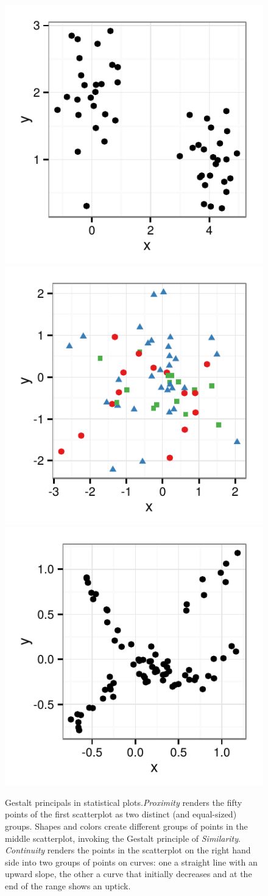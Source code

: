 \documentclass[11pt]{isuthesis}\usepackage[]{graphicx}\usepackage[]{color}
\newenvironment{knitrout}{}{} %
\begin{document}
\begin{figure}\centering
\begin{knitrout}
\color{fgcolor}

{\centering \includegraphics[width=0.32\linewidth]{Figure/FeatureHierarchy/fig-gestalt1-1} 
\includegraphics[width=0.32\linewidth]{Figure/FeatureHierarchy/fig-gestalt1-2} 
\includegraphics[width=0.32\linewidth]{Figure/FeatureHierarchy/fig-gestalt1-3} 

}



\end{knitrout}
\caption[Gestalt principles in statistical plots]{\label{fig:gestalt} Gestalt principals in statistical plots.\emph{Proximity} renders the fifty points of the first scatterplot as two distinct (and equal-sized) groups. Shapes and colors create different groups of points in the middle scatterplot, invoking the Gestalt principle of \emph{Similarity}. \emph{Continuity} renders the points in the scatterplot on the right hand side into two groups of points on curves: one a straight line with an upward slope, the other a curve that initially decreases and at the end of the range shows an uptick.} 
\end{figure}
\end{document}

